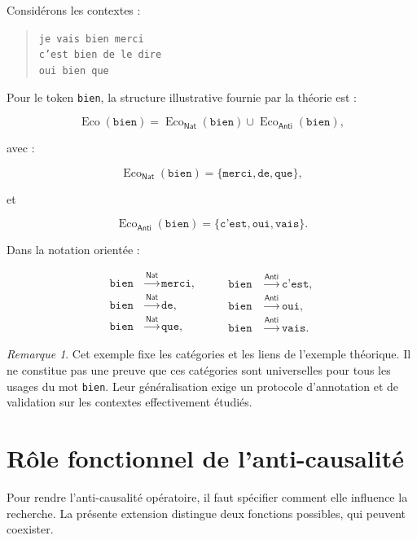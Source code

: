 \documentclass[11pt,a4paper,oneside]{book}
\theoremstyle{remark}
\newtheorem{remarque}[definition]{Remarque}
\DeclareMathOperator{\Eco}{Eco}
\newcommand{\Nat}{\mathsf{Nat}}
\newcommand{\Anti}{\mathsf{Anti}}
\begin{document}
Considérons les contextes :

\begin{quote}
  \texttt{je vais bien merci}\\
  \texttt{c'est bien de le dire}\\
  \texttt{oui bien que}
\end{quote}

Pour le token \texttt{bien}, la structure illustrative fournie
par la théorie est :

\[
\Eco(\texttt{bien})
=
\Eco_{\Nat}(\texttt{bien})
\cup
\Eco_{\Anti}(\texttt{bien}),
\]

avec :

\[
\Eco_{\Nat}(\texttt{bien})
=
\{
\texttt{merci},
\texttt{de},
\texttt{que}
\},
\]

et

\[
\Eco_{\Anti}(\texttt{bien})
=
\{
\texttt{c'est},
\texttt{oui},
\texttt{vais}
\}.
\]

Dans la notation orientée :

\[
\begin{aligned}
\texttt{bien}&\xrightarrow{\Nat}\texttt{merci},\\
\texttt{bien}&\xrightarrow{\Nat}\texttt{de},\\
\texttt{bien}&\xrightarrow{\Nat}\texttt{que},
\end{aligned}
\qquad
\begin{aligned}
\texttt{bien}&\xrightarrow{\Anti}\texttt{c'est},\\
\texttt{bien}&\xrightarrow{\Anti}\texttt{oui},\\
\texttt{bien}&\xrightarrow{\Anti}\texttt{vais}.
\end{aligned}
\]

\begin{remarque}
Cet exemple fixe les catégories et les liens de l'exemple théorique.
Il ne constitue pas une preuve que ces catégories sont universelles
pour tous les usages du mot \texttt{bien}. Leur généralisation exige
un protocole d'annotation et de validation sur les contextes
effectivement étudiés.
\end{remarque}

\section{Rôle fonctionnel de l'anti-causalité}

Pour rendre l'anti-causalité opératoire, il faut spécifier comment
elle influence la recherche. La présente extension distingue
deux fonctions possibles, qui peuvent coexister.
\end{document}
